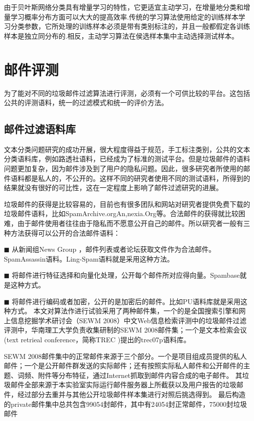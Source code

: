 由于贝叶斯网络分类具有增量学习的特性，它更适宜主动学习，在增量地分类和增量学习概率分布方面可以大大的提高效率.传统的学习算法使用给定的训练样本学习分类参数，它所处理的训练样本必须是带有类别标注的，并且一般都假定各训练样本是独立同分布的.相反，主动学习算法在侯选样本集中主动选择测试样本。
\section{邮件评测}
为了能对不同的垃圾邮件过滤算法进行评测，必须有一个可供比较的平台。这包括公共的评测语料，统一的过滤模式和统一的评价方法。
\subsection{邮件过滤语料库}
文本分类问题研究的成功开展，很大程度得益于规范，手工标注类别，公共的文本分类语料库，例如路透社语料，已经成为了标准的测试平台。但是垃圾邮件的语料问题更加复杂，因为邮件涉及到了用户的隐私问题。因此，很多研究者所使用的邮件语料都是私人的，不公开的。这样不同的研究者使用不同的测试语料，所得到的结果就没有很好的可比性，这在一定程度上影响了邮件过滤研究的进展。

垃圾邮件的获得是比较容易的，目前也有很多团队和网站对研究者提供免费下载的垃圾邮件语料，比如SpamArchive.orgAn,nexia.Org等。合法邮件的获得就比较困难，由于邮件使用者往往由于隐私而不愿意公开自己的邮件。所以研究者一般有三种方法获得可以公开的合法邮件语料：

$\blacksquare$ 从新闻组News Group ，邮件列表或者论坛获取文件作为合法邮件。SpamAssassin语料。Ling-Spam语料就是采用这种方法。

$\blacksquare$ 将邮件进行特征选择和向量化处理，公开每个邮件所对应得向量。Spambase就是这种方式。

$\blacksquare$ 将邮件进行编码或者加密，公开的是加密后的邮件。比如PU语料库就是采用这种方式。
本文对算法作进行试验采用了两种邮件集，一个的是全国搜索引擎和网上信息挖掘学术研讨会（SEWM 2008）中文Web信息检索评测中的垃圾邮件过滤评测中，华南理工大学负责收集研制的SEWM 2008邮件集；一个是文本检索会议(text  retrieal conference，简称TREC )提出的trec07p语料库。

SEWM 2008邮件集中的正常邮件来源于三个部分。一个是项目组成员提供的私人邮件；一个是公开邮件群发送的实际邮件；还有按照实际私人邮件和公开邮件的主题、词频、附件等分布特征，通过Internet抓取到邮件内容合成的电子邮件。 其垃圾邮件全部来源于本实验室实际运行邮件服务器上所截获以及用户报告的垃圾邮件，经过部分去重并与其他公开垃圾邮件样本集进行对照后挑选得到。 最后构造的private邮件集中总共包含99054封邮件，其中有24054封正常邮件，75000封垃圾邮件

